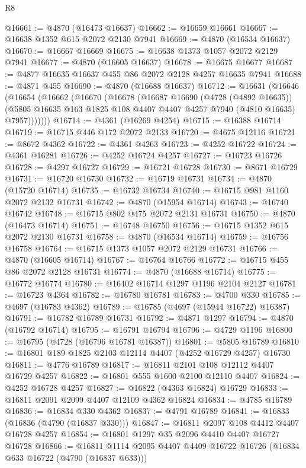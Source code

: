 \begin{lexlean}{R8}
\begin{coremodule}
@16661 := @4870 (@16473 @16637)
@16662 := @16659 @16661
@16667 := @16638 @1352 @615 @2072 @2130 @7941
@16669 := @4870 (@16534 @16637)
@16670 := @16667 @16669
@16675 := @16638 @1373 @1057 @2072 @2129 @7941
@16677 := @4870 (@16605 @16637)
@16678 := @16675 @16677
@16687 := @4877 @16635 @16637 @455 @86 @2072 @2128 @4257 @16635 @7941
@16688 := @4871 @455
@16690 := @4870 (@16688 @16637)
@16712 := @16631
    (@16646
      (@16654
        (@16662
          (@16670
            (@16678
              (@16687
                @16690
                (@4728 (@4892 @16635))
                (@5805 @16635 @163 @1825 @108 @4407 @4407 @4257 @7940 (@4810 @16635) @7957)))))))
@16714 := @4361 (@16269 @4254)
@16715 := @16388 @16714
@16719 := @16715 @446 @172 @2072 @2133
@16720 := @4675 @12116
@16721 := @8672 @4362
@16722 := @4361 @4263
@16723 := @4252 @16722
@16724 := @4361 @16281
@16726 := @4252 @16724 @4257
@16727 := @16723 @16726
@16728 := @4297 @16727
@16729 := @16721 @16728
@16730 := @8671 @16729
@16731 := @16720 @16730
@16732 := @16719 @16731
@16734 := @4870 (@15720 @16714)
@16735 := @16732 @16734
@16740 := @16715 @981 @1160 @2072 @2132 @16731
@16742 := @4870 (@15954 @16714)
@16743 := @16740 @16742
@16748 := @16715 @802 @475 @2072 @2131 @16731
@16750 := @4870 (@16473 @16714)
@16751 := @16748 @16750
@16756 := @16715 @1352 @615 @2072 @2130 @16731
@16758 := @4870 (@16534 @16714)
@16759 := @16756 @16758
@16764 := @16715 @1373 @1057 @2072 @2129 @16731
@16766 := @4870 (@16605 @16714)
@16767 := @16764 @16766
@16772 := @16715 @455 @86 @2072 @2128 @16731
@16774 := @4870 (@16688 @16714)
@16775 := @16772 @16774
@16780 := @16402 @16714 @1297 @1196 @2104 @2127
@16781 := @16723 @4364
@16782 := @16780 @16781
@16783 := @4700 @330
@16785 := @4697 (@16783 @4362)
@16789 := @16785 (@4697 (@15944 @16722) @16387)
@16791 := @16782 @16789 @16731
@16792 := @4871 @1297
@16794 := @4870 (@16792 @16714)
@16795 := @16791 @16794
@16796 := @4729 @1196
@16800 := @16795 (@4728 (@16796 @16781 @16387))
@16801 := @5805 @16789
@16810 := @16801 @189 @1825 @2103 @12114 @4407 (@4252 @16729 @4257) @16730
@16811 := @4776 @16789
@16817 := @16811 @2101 @108 @12112 @4407 @16729 @4257
@16822 := @16801 @555 @1600 @2100 @12110 @4407
@16824 := @4252 @16728 @4257
@16827 := @16822 (@4363 @16824) @16729
@16833 := @16811 @2091 @2099 @4407 @12109 @4362 @16824
@16834 := @4785 @16789
@16836 := @16834 @330 @4362
@16837 := @4791 @16789
@16841 := @16833 (@16836 (@4790 (@16837 @330)))
@16847 := @16811 @2097 @108 @4412 @4407 @16728 @4257
@16854 := @16801 @1297 @35 @2096 @4410 @4407 @16727 @16728
@16866 := @16811 @1114 @2095 @4407 @4409 @16722 @16726 (@16834 @633 @16722 (@4790 (@16837 @633)))

\end{coremodule}
\end{lexlean}
